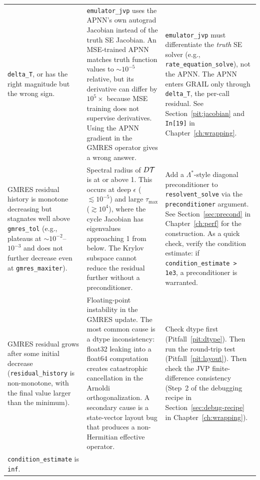 \begin{longtable}{p{} p{} p{}}
\texttt{delta\_T}, or has the right magnitude but the wrong sign.
&
\raggedright\arraybackslash
\texttt{emulator\_jvp} uses the APNN's own autograd Jacobian instead of
the truth SE Jacobian.
An MSE-trained APNN matches truth function values to $\sim\!10^{-5}$
relative, but its derivative can differ by $10^5\times$ because MSE
training does not supervise derivatives.
Using the APNN gradient in the GMRES operator gives a wrong answer.
&
\raggedright\arraybackslash
\texttt{emulator\_jvp} must differentiate the \emph{truth} SE solver
(e.g., \texttt{rate\_equation\_solve}), not the APNN.
The APNN enters GRAIL only through \texttt{delta\_T}, the per-call
residual.
See Section~\ref{pit:jacobian} and \texttt{In[19]} in
Chapter~\ref{ch:wrapping}.
\\
\raggedright\arraybackslash
GMRES residual history is monotone decreasing but stagnates well above
\texttt{gmres\_tol} (e.g., plateaus at $\sim 10^{-2}$--$10^{-3}$ and
does not further decrease even at \texttt{gmres\_maxiter}).
&
\raggedright\arraybackslash
Spectral radius of $D\mathcal{T}$ is at or above 1.
This occurs at deep $\epsilon$ ($\lesssim 10^{-5}$) and large
$\tau_\mathrm{max}$ ($\gtrsim 10^4$), where the cycle Jacobian has
eigenvalues approaching 1 from below.
The Krylov subspace cannot reduce the residual further without a
preconditioner.
&
\raggedright\arraybackslash
Add a $\Lambda^*$-style diagonal preconditioner to \texttt{resolvent\_solve}
via the \texttt{preconditioner} argument.
See Section~\ref{sec:precond} in Chapter~\ref{ch:perf} for the
construction.
As a quick check, verify the condition estimate:
if \texttt{condition\_estimate > 1e3}, a preconditioner is warranted.
\\
\raggedright\arraybackslash
GMRES residual grows after some initial decrease
(\texttt{residual\_history} is non-monotone, with the final value larger
than the minimum).
&
\raggedright\arraybackslash
Floating-point instability in the GMRES update.
The most common cause is a dtype inconsistency: float32 leaking into
a float64 computation creates catastrophic cancellation in the Arnoldi
orthogonalization.
A secondary cause is a state-vector layout bug that produces a
non-Hermitian effective operator.
&
\raggedright\arraybackslash
Check dtype first (Pitfall~\ref{pit:dtype}).
Then run the round-trip test (Pitfall~\ref{pit:layout}).
Then check the JVP finite-difference consistency (Step~2 of the
debugging recipe in Section~\ref{sec:debug-recipe} in
Chapter~\ref{ch:wrapping}).
\\
\raggedright\arraybackslash
\texttt{condition\_estimate} is \texttt{inf}.

\end{longtable}
